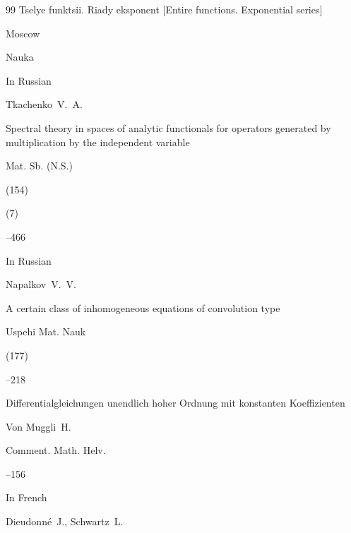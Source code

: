 \begin{thebibliography}{99}
\book  Tselye funktsii. Riady eksponent \rm [Entire functions. Exponential series]

\publaddr Moscow

\publ Nauka






\lang In Russian

\by Tkachenko~V.~A.

\paper Spectral theory in spaces of analytic functionals for operators generated by multiplication by the independent variable

\jour Mat. Sb. (N.S.) 

(154) 


(7)

–466




\lang In Russian

\by Napalkov~V.~V.

\paper A certain class of inhomogeneous equations of convolution type

\jour Uspehi Mat. Nauk 



(177)

–218







\paper Differentialgleichungen unendlich hoher Ordnung mit konstanten Koeffizienten

\by    Von Muggli~H.

\jour  Comment. Math. Helv.




--156








\lang In French

\by Dieudonn\'e~J., Schwartz~L.


\end{thebibliography}
